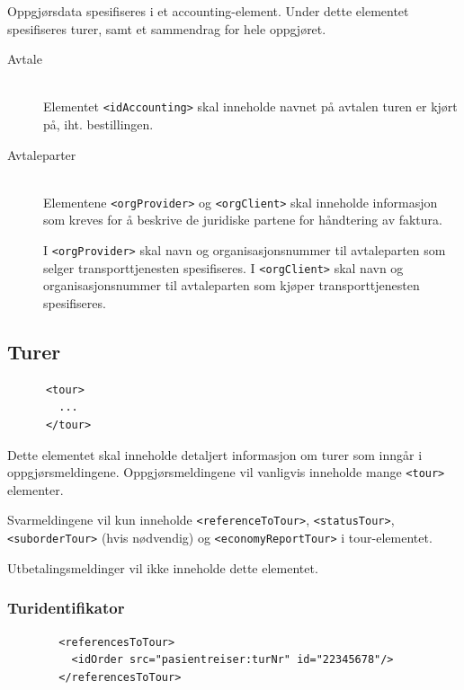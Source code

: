 \documentclass[a4paper,titlepage,norsk,11pt]{article}
\begin{document}
Oppgjørsdata spesifiseres i et accounting-element. Under dette elementet spesifiseres turer, samt et sammendrag for hele oppgjøret.

\begin{description}

  \item[Avtale] \hfill \\
  Elementet \lstinline{<idAccounting>} skal inneholde navnet på avtalen turen er kjørt på, iht. bestillingen.

	\item[Avtaleparter] \hfill \\
	Elementene \lstinline{<orgProvider>} og \lstinline{<orgClient>} skal inneholde informasjon som kreves for å beskrive de juridiske partene for håndtering av faktura.

	I \lstinline{<orgProvider>} skal navn og organisasjonsnummer til avtaleparten som selger transporttjenesten spesifiseres. I \lstinline{<orgClient>} skal navn og organisasjonsnummer til avtaleparten som kjøper transporttjenesten spesifiseres.

\end{description}

\subsection{Turer}

\begin{lstlisting}
      <tour>
        ...
      </tour>
\end{lstlisting}

Dette elementet skal inneholde detaljert informasjon om turer som inngår i oppgjørsmeldingene. Oppgjørsmeldingene vil vanligvis inneholde mange \lstinline{<tour>} elementer.

Svarmeldingene vil kun inneholde \lstinline{<referenceToTour>}, \lstinline{<statusTour>}, \lstinline{<suborderTour>} (hvis nødvendig) og \lstinline{<economyReportTour>} i tour-elementet.

Utbetalingsmeldinger vil ikke inneholde dette elementet.

\subsubsection{Turidentifikator}

\begin{lstlisting}
        <referencesToTour>
          <idOrder src="pasientreiser:turNr" id="22345678"/>
        </referencesToTour>
\end{lstlisting}
\end{document}
